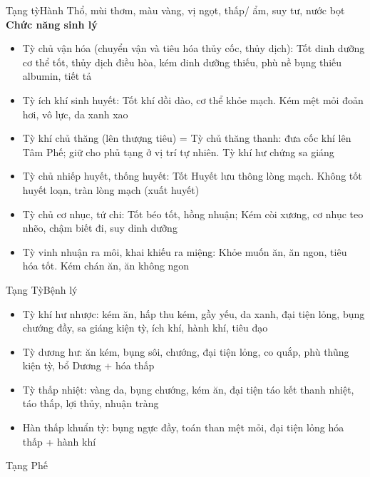 \documentclass[
	11pt, %
]{beamer}
\theoremstyle{newblock}
\begin{document}
\begin{frame}{Tạng tỳ}{Hành Thổ, mùi thơm, màu vàng, vị ngọt, thấp/ ẩm, suy tư, nước bọt}
{\bf Chức năng sinh lý}\\
\begin{itemize}
	\item Tỳ chủ vận hóa (chuyển vận và tiêu hóa thủy cốc, thủy dịch): Tốt    dinh dưỡng cơ thể tốt, thủy dịch điều hòa, kém    dinh dưỡng thiếu, phù nề bụng thiếu albumin, tiết tả
	\item Tỳ ích khí sinh huyết: Tốt    khí dồi dào, cơ thể khỏe mạch. Kém    mệt mỏi đoản hơi, vô lực, da xanh xao
	\item Tỳ khí chủ thăng (lên thượng tiêu) = Tỳ chủ thăng thanh: đưa cốc khí lên Tâm Phế; giữ cho phủ tạng ở vị trí tự nhiên. Tỳ khí hư    chứng sa giáng
	\item Tỳ chủ nhiếp huyết, thống huyết: Tốt    Huyết lưu thông lòng mạch. Không tốt    huyết loạn, tràn lòng mạch (xuất huyết)
	\item Tỳ chủ cơ nhục, tứ chi: Tốt    béo tốt, hồng nhuận; Kém    còi xương, cơ nhục teo nhẽo, chậm biết đi, suy dinh dưỡng
	\item Tỳ vinh nhuận ra môi, khai khiếu ra miệng: Khỏe  muốn ăn, ăn ngon, tiêu hóa tốt. Kém chán ăn, ăn không ngon
\end{itemize}
\end{frame}
\begin{frame}{Tạng Tỳ}{Bệnh lý}
\begin{itemize}
	\item Tỳ khí hư nhược: kém ăn, hấp thu kém, gầy yếu, da xanh, đại tiện lỏng, bụng chướng đầy, sa giáng  kiện tỳ, ích khí, hành khí, tiêu đạo
	\item Tỳ dương hư: ăn kém, bụng sôi, chướng, đại tiện lỏng, co quắp, phù thũng  kiện tỳ, bổ Dương + hóa thấp
	\item Tỳ thấp nhiệt: vàng da, bụng chướng, kém ăn, đại tiện táo kết	thanh nhiệt, táo thấp, lợi thủy, nhuận tràng
	\item Hàn thấp khuẩn tỳ: bụng ngực đầy, toán than mệt mỏi, đại tiện lỏng  hóa thấp + hành khí
\end{itemize}
\end{frame}
\begin{frame}
	\Huge{Tạng Phế}
\end{frame}
\end{document}
